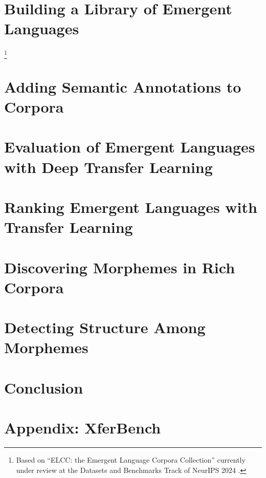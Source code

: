 \newpage
\tableofcontents*



\chapter{Building a Library of Emergent Languages }
\unskip\label{ch:elcc}

\footnote{Based on ``ELCC: the Emergent Language Corpora Collection'' currently under review at the Datasets and Benchmarks Track of NeurIPS 2024 .}


\chapter{Adding Semantic Annotations to Corpora }
\unskip\label{ch:rich-corpora}




\chapter{Evaluation of Emergent Languages with Deep Transfer Learning}
\unskip\label{ch:xferbench}



\chapter{Ranking Emergent Languages with Transfer Learning }
\unskip\label{ch:xferbench-analysis}



\chapter{Discovering Morphemes in Rich Corpora }
\unskip\label{ch:morphemes}



\chapter{Detecting Structure Among Morphemes }
\unskip\label{ch:syntax}




\chapter{Conclusion}
\unskip\label{ch:conclusion}




\appendix

\chapter{Appendix: XferBench}



